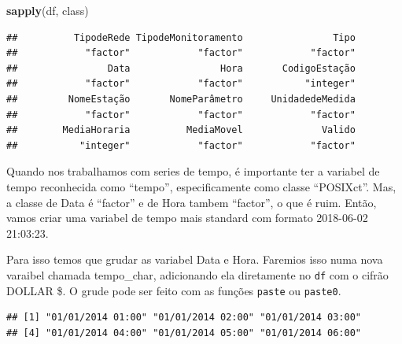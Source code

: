 \documentclass[]{book}
\newenvironment{Shaded}{\begin{snugshade}}{\end{snugshade}}
\newcommand{\KeywordTok}[1]{\textcolor[rgb]{0.13,0.29,0.53}{\textbf{#1}}}
\newcommand{\StringTok}[1]{\textcolor[rgb]{0.31,0.60,0.02}{#1}}
\newcommand{\OperatorTok}[1]{\textcolor[rgb]{0.81,0.36,0.00}{\textbf{#1}}}
\newcommand{\NormalTok}[1]{#1}
\theoremstyle{definition}
\theoremstyle{definition}
\theoremstyle{definition}
\theoremstyle{remark}
\begin{document}
\begin{Shaded}
\begin{Highlighting}[]
\KeywordTok{sapply}\NormalTok{(df, class)}
\end{Highlighting}
\end{Shaded}

\begin{verbatim}
##          TipodeRede TipodeMonitoramento                Tipo 
##            "factor"            "factor"            "factor" 
##                Data                Hora       CodigoEstação 
##            "factor"            "factor"           "integer" 
##         NomeEstação       NomeParâmetro     UnidadedeMedida 
##            "factor"            "factor"            "factor" 
##        MediaHoraria          MediaMovel              Valido 
##           "integer"            "factor"            "factor"
\end{verbatim}

Quando nos trabalhamos com series de tempo, é importante ter a variabel
de tempo reconhecida como ``tempo'', especificamente como classe
``POSIXct''. Mas, a classe de Data é ``factor'' e de Hora tambem
``factor'', o que é ruim. Então, vamos criar uma variabel de tempo mais
standard com formato 2018-06-02 21:03:23.

Para isso temos que grudar as variabel Data e Hora. Faremios isso numa
nova varaibel chamada tempo\_char, adicionando ela diretamente no
\texttt{df} com o cifrão DOLLAR \$. O grude pode ser feito com as
funções \texttt{paste} ou \texttt{paste0}.

\begin{Shaded}
\end{Shaded}

\begin{verbatim}
## [1] "01/01/2014 01:00" "01/01/2014 02:00" "01/01/2014 03:00"
## [4] "01/01/2014 04:00" "01/01/2014 05:00" "01/01/2014 06:00"
\end{verbatim}

\begin{Shaded}
\end{Shaded}
\end{document}
